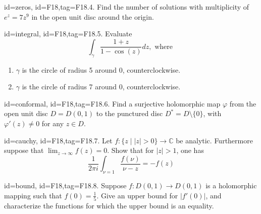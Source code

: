 \documentclass[12pt,letterpaper]{article}
\begin{document}
{\item[id=zeros, id=F18,tag=F18.4.]
Find the number of solutions with multiplicity of $e^z = 7z^9$ in the open unit disc around the origin.

\item[id=integral, id=F18,tag=F18.5.]
Evaluate
\[
	\int_{\gamma} \frac{1+z}{1 - \cos(z)} dz, \text{ where }
\]
\begin{enumerate}[label=(\alph*)]\onlyitems
\item $\gamma$ is the circle of radius 5 around 0, counterclockwise.
\item $\gamma$ is the circle of radius 7 around 0, counterclockwise.
\end{enumerate}

\item[id=conformal, id=F18,tag=F18.6.]
Find a surjective holomorphic map $\varphi$ from the open unit disc $D = D(0,1)$ to the punctured disc $D^* = D \setminus \{0\}$, with $\varphi'(z) \ne 0$ for any $z \in D$. 
\item[id=cauchy, id=F18,tag=F18.7.]
Let $f : \{z \mid | z | > 0\} \rightarrow \mathbb{C}$ be analytic. Furthermore suppose that $\lim_{z\rightarrow \infty} f(z) = 0$. Show that for $| z | > 1$, one has
\[
	\frac{1}{2\pi i} \int_{\nu = 1} \frac{f(\nu)}{\nu - z} = - f(z)
\]
\item[id=bound, id=F18,tag=F18.8.]
Suppose $f : D(0,1) \rightarrow D(0,1)$ is a holomorphic mapping such that $f(0) = \frac{1}{5}$. Give an upper bound for $| f'(0) |$, and characterize the functions for which the upper bound is an equality.



}
\end{document}
